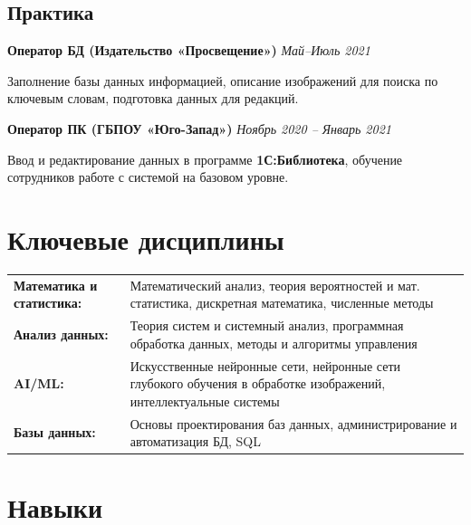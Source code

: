 \documentclass[10pt,a4paper]{article}
\newcommand{\projectEntry}[3]{\textbf{#1} \hfill \textit{#2}\par #3\par\vspace{0.3em}}
\begin{document}
\subsection{Практика}

\projectEntry{Оператор БД (Издательство «Просвещение»)}{Май–Июль 2021}
{Заполнение базы данных информацией, описание изображений для поиска по ключевым словам, подготовка данных для редакций.}

\projectEntry{Оператор ПК (ГБПОУ «Юго-Запад»)}{Ноябрь 2020 – Январь 2021}
{Ввод и редактирование данных в программе \textbf{1С:Библиотека}, обучение сотрудников работе с системой на базовом уровне.}

\makeEducation

\section{Ключевые дисциплины}

\begin{tabular}{p{6cm} p{10cm}}
    \textbf{Математика и статистика:} & Математический анализ, теория вероятностей и мат. статистика, дискретная математика, численные методы \\
    \textbf{Анализ данных:} & Теория систем и системный анализ, программная обработка данных, методы и алгоритмы управления \\
    \textbf{AI/ML:} & Искусственные нейронные сети, нейронные сети глубокого обучения в обработке изображений, интеллектуальные системы \\
    \textbf{Базы данных:} & Основы проектирования баз данных, администрирование и автоматизация БД, SQL
\end{tabular}

\section{Навыки}
\end{document}

